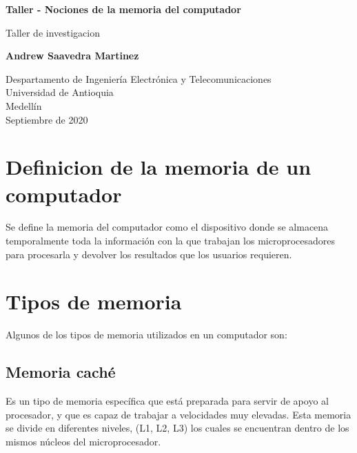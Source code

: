 \documentclass{article}
\begin{document}
\begin{titlepage}
    \begin{center}
        \vspace*{1cm}
            
        \Huge
        \textbf{Taller - Nociones de la memoria del computador}
            
        \vspace{0.5cm}
        \LARGE
        Taller de investigacion
            
        \vspace{1.5cm}
            
        \textbf{Andrew Saavedra Martinez}
            
        \vfill
            
        \vspace{0.8cm}
            
        \Large
        Despartamento de Ingeniería Electrónica y Telecomunicaciones\\
        Universidad de Antioquia\\
        Medellín\\
        Septiembre de 2020
            
    \end{center}
\end{titlepage}

\tableofcontents
\newpage
\section{Definicion de la memoria de un computador}\label{intro}
Se define la memoria del computador como el dispositivo donde se almacena temporalmente toda la información con la que trabajan los microprocesadores para procesarla y devolver los resultados que los usuarios requieren.\cite{youbioit.com}

\section{Tipos de memoria} \label{contenido}
Algunos de los tipos de memoria utilizados en un computador son:
\subsection{Memoria caché}
Es un tipo de memoria específica que está preparada para servir de apoyo al procesador, y que es capaz de trabajar a velocidades muy elevadas. Esta memoria se divide en diferentes niveles, (L1, L2, L3) los cuales se encuentran dentro de los mismos núcleos del microprocesador.\cite{stallings2006organizacion}
\end{document}
